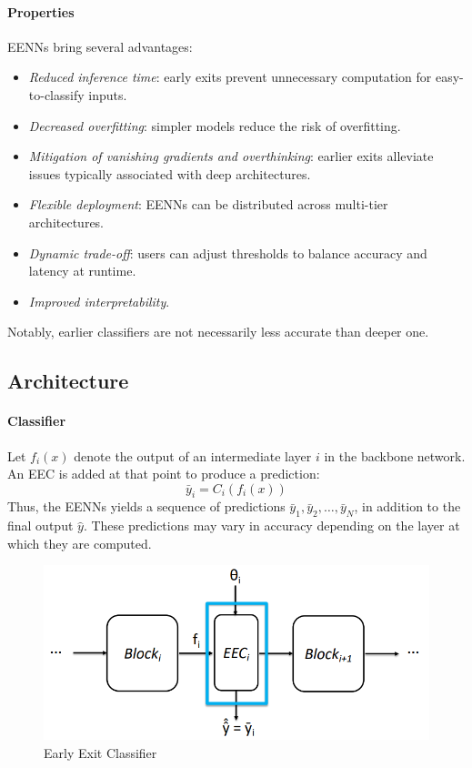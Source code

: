 \paragraph*{Properties}
EENNs bring several advantages:
\begin{itemize}
    \item \textit{Reduced inference time}: early exits prevent unnecessary computation for easy-to-classify inputs.
    \item \textit{Decreased overfitting}: simpler models reduce the risk of overfitting.
    \item \textit{Mitigation of vanishing gradients and overthinking}: earlier exits alleviate issues typically associated with deep architectures.
    \item \textit{Flexible deployment}: EENNs can be distributed across multi-tier architectures.
    \item \textit{Dynamic trade-off}: users can adjust thresholds to balance accuracy and latency at runtime.
    \item \textit{Improved interpretability}.
\end{itemize}
\noindent Notably, earlier classifiers are not necessarily less accurate than deeper one.

\subsection{Architecture}
\paragraph*{Classifier}
Let $f_i(x)$ denote the output of an intermediate layer $i$ in the backbone network.
An EEC is added at that point to produce a prediction:
\[\bar{y}_i=C_i(f_i(x))\]
Thus, the EENNs yields a sequence of predictions $\bar{y}_1,\bar{y}_2,\dots,\bar{y}_N$, in addition to the final output $\hat{y}$.
These predictions may vary in accuracy depending on the layer at which they are computed.
\begin{figure}[H]
    \centering
    \includegraphics[width=0.75\linewidth]{images/eeai11.png}
    \caption{Early Exit Classifier}
\end{figure}

